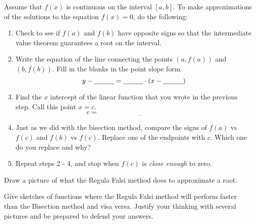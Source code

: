 \begin{algorithm}
    Assume that $f(x)$ is continuous on the interval $[a,b]$. To make approximations of
    the solutions to the equation $f(x) = 0$, do the following:
    \begin{enumerate}
        \item Check to see if $f(a)$ and $f(b)$ have opposite signs so that the
            intermediate value theorem guarantees a root on the interval.
        \item Write the equation of the line connecting the points $(a,f(a))$ and
            $(b,f(b))$. Fill in the blanks in the point slope form.
            \[ y - \underline{\hspace{0.4in}} = \underline{\hspace{0.4in}} \cdot \left(
                x - \underline{\hspace{0.4in}} \right) \]
            \solution{
                \[ y - f(a) = \left( \frac{f(b) - f(a)}{b-a} \right) \left( x-a
                    \right) \]
            }
        \item Find the $x$ intercept of the linear function that you wrote in the previous
            step.  Call this point $x=c$.
            \[ c = \underline{\hspace{2in}} \]
            \solution{
                \[ 0 - f(a) = \left( \frac{f(b) - f(a)}{b-a} \right) \left( x-a
                    \right) \implies x = a+ \left( \frac{-f(a) (b-a)}{f(b)-f(a)} \right) \]
            }
        \item Just as we did with the bisection method, compare the signs of $f(a)$ vs
            $f(c)$ and $f(b)$ vs $f(c)$.  Replace one of the endpoints with $c$. Which one
            do you replace and why?
        \item Repeat steps 2 - 4, and stop when $f(c)$ is {\it close enough} to zero.
    \end{enumerate}
\end{algorithm}

\begin{problem}
    Draw a picture of what the Regula Falsi method does to approximate a root.
\end{problem}


\begin{problem}
    Give sketches of functions where the Regula Falsi method will perform faster than the
    Bisection method and visa versa.  Justify your thinking with several pictures and be
    prepared to defend your answers.
\end{problem}


